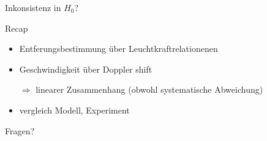 \documentclass[10pt, dvipsnames]{beamer}
\newcommand{\s}[1]{{\color{MyBlue}#1}}
\begin{document}
	\begin{frame}{Inkonsistenz in \( H_0 \)?}
		\centering	
	\end{frame}

	\begin{frame}{Recap}
		\begin{itemize}[label={\textendash}, itemindent=0.1cm]
			\item \s{Entferungsbestimmung} über Leuchtkraftrelationenen
			\item \s{Geschwindigkeit} über Doppler shift
			\item[\( \Rightarrow \)] linearer Zusammenhang (obwohl systematische Abweichung)
			\item vergleich Modell, Experiment
		\end{itemize}
	\end{frame}

\begin{frame}[standout]
	\Huge Fragen?
\end{frame}
\end{document}
